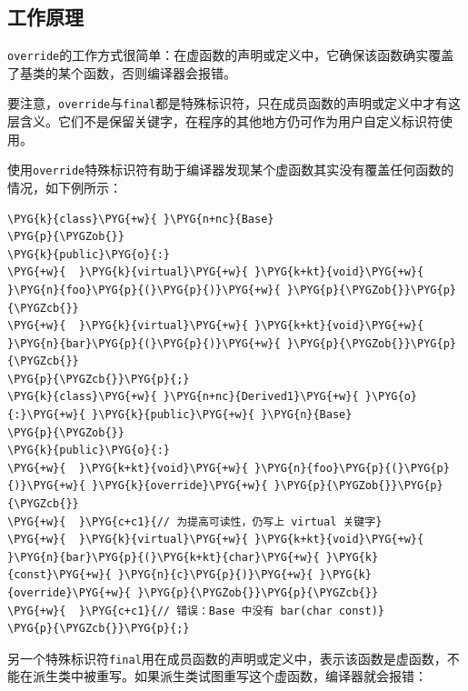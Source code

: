 
\subsection{工作原理}



\texttt{override}的工作方式很简单：在虚函数的声明或定义中，它确保该函数确实覆盖了基类的某个函数，否则编译器会报错。



要注意，\texttt{override}与\texttt{final}都是特殊标识符，只在成员函数的声明或定义中才有这层含义。它们不是保留关键字，在程序的其他地方仍可作为用户自定义标识符使用。



使用\texttt{override}特殊标识符有助于编译器发现某个虚函数其实没有覆盖任何函数的情况，如下例所示：



\begin{codeblockbg}
\begin{Verbatim}[commandchars=\\\{\},breaklines=true,breakanywhere=true,fontsize=\codefont,xleftmargin=17bp]
\PYG{k}{class}\PYG{+w}{ }\PYG{n+nc}{Base}
\PYG{p}{\PYGZob{}}
\PYG{k}{public}\PYG{o}{:}
\PYG{+w}{  }\PYG{k}{virtual}\PYG{+w}{ }\PYG{k+kt}{void}\PYG{+w}{ }\PYG{n}{foo}\PYG{p}{(}\PYG{p}{)}\PYG{+w}{ }\PYG{p}{\PYGZob{}}\PYG{p}{\PYGZcb{}}
\PYG{+w}{  }\PYG{k}{virtual}\PYG{+w}{ }\PYG{k+kt}{void}\PYG{+w}{ }\PYG{n}{bar}\PYG{p}{(}\PYG{p}{)}\PYG{+w}{ }\PYG{p}{\PYGZob{}}\PYG{p}{\PYGZcb{}}
\PYG{p}{\PYGZcb{}}\PYG{p}{;}
\PYG{k}{class}\PYG{+w}{ }\PYG{n+nc}{Derived1}\PYG{+w}{ }\PYG{o}{:}\PYG{+w}{ }\PYG{k}{public}\PYG{+w}{ }\PYG{n}{Base}
\PYG{p}{\PYGZob{}}
\PYG{k}{public}\PYG{o}{:}
\PYG{+w}{  }\PYG{k+kt}{void}\PYG{+w}{ }\PYG{n}{foo}\PYG{p}{(}\PYG{p}{)}\PYG{+w}{ }\PYG{k}{override}\PYG{+w}{ }\PYG{p}{\PYGZob{}}\PYG{p}{\PYGZcb{}}
\PYG{+w}{  }\PYG{c+c1}{// 为提高可读性，仍写上 virtual 关键字}
\PYG{+w}{  }\PYG{k}{virtual}\PYG{+w}{ }\PYG{k+kt}{void}\PYG{+w}{ }\PYG{n}{bar}\PYG{p}{(}\PYG{k+kt}{char}\PYG{+w}{ }\PYG{k}{const}\PYG{+w}{ }\PYG{n}{c}\PYG{p}{)}\PYG{+w}{ }\PYG{k}{override}\PYG{+w}{ }\PYG{p}{\PYGZob{}}\PYG{p}{\PYGZcb{}}
\PYG{+w}{  }\PYG{c+c1}{// 错误：Base 中没有 bar(char const)}
\PYG{p}{\PYGZcb{}}\PYG{p}{;}
\end{Verbatim}
\end{codeblockbg}


另一个特殊标识符\texttt{final}用在成员函数的声明或定义中，表示该函数是虚函数，不能在派生类中被重写。如果派生类试图重写这个虚函数，编译器就会报错：



